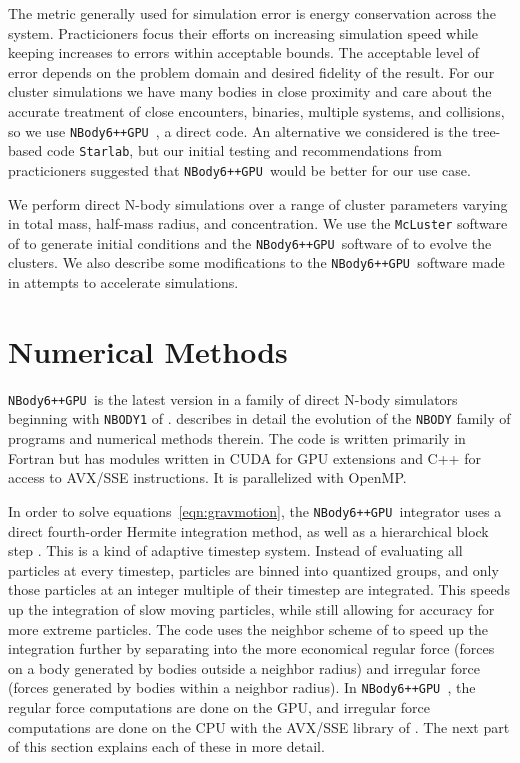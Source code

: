 \documentclass{princeton_astro_thesis}
\newcommand\nbody{\texttt{NBody6++GPU }}
\numberwithin{equation}{section}
\begin{document}
The metric generally used for simulation error is energy conservation across the system. Practicioners focus their efforts on increasing simulation speed while keeping increases to errors within acceptable bounds. The acceptable level of error depends on the problem domain and desired fidelity of the result.  For our cluster simulations we have many bodies in close proximity and care about the accurate treatment of close encounters, binaries, multiple systems, and collisions, so we use \nbody, a direct code.  An alternative we considered is the tree-based code \texttt{Starlab}, but our initial testing and recommendations from practicioners suggested that \nbody would be better for our use case.

We perform direct N-body simulations over a range of cluster parameters varying in total mass, half-mass radius, and concentration.  We use the \texttt{McLuster} software of \citet{2011Kupper} to generate initial conditions and the \nbody software of \citet{2015Wang} to evolve the clusters. We also describe some modifications to the \nbody software made in attempts to accelerate simulations.

\section{Numerical Methods}
\nbody is the latest version in a family of direct N-body simulators beginning with \texttt{NBODY1} of \citet{1963Aarseth}. \citet{1999Aarseth} describes in detail the evolution of the \texttt{NBODY} family of programs and numerical methods therein.  The code is written primarily in Fortran but has modules written in CUDA for GPU extensions and C++ for access to AVX/SSE instructions. It is parallelized with OpenMP.

In order to solve equations~\ref{eqn:gravmotion}, the \nbody integrator uses a direct fourth-order Hermite integration method, as well as a hierarchical block step \citep[][and refs within]{2015Wang}. This is a kind of adaptive timestep system. Instead of evaluating all particles at every timestep, particles are binned into quantized groups, and only those particles at an integer multiple of their timestep are integrated. This speeds up the integration of slow moving particles, while still allowing for accuracy for more extreme particles. The code uses the neighbor scheme of \citet{1973Ahmad} to speed up the integration further by separating into the more economical regular force (forces on a body generated by bodies outside a neighbor radius) and irregular force (forces generated by bodies within a neighbor radius). In \nbody, the regular force computations are done on the GPU, and irregular force computations are done on the CPU with the AVX/SSE library of \citet{2012Nitadori}. The next part of this section explains each of these in more detail.
\end{document}
